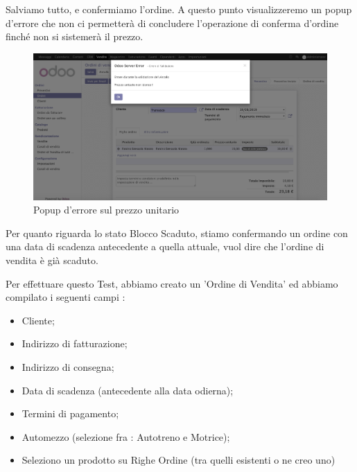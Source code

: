 \newpage
Salviamo tutto, e confermiamo l'ordine. A questo punto visualizzeremo un popup d'errore che non ci permetterà di concludere l'operazione di conferma d'ordine finché non si sistemerà il prezzo.
\begin{figure}[H]
	\begin{center} \includegraphics[scale=0.3]{figures/error_price}
		\caption[Popup d'errore sul prezzo unitario]{Popup d'errore sul prezzo unitario}
		\label{fig:error_price}
	\end{center}
\end{figure}
Per quanto riguarda lo stato Blocco Scaduto, stiamo confermando un ordine con una data di scadenza antecedente a quella attuale, vuol dire che l'ordine di vendita è già scaduto.

\vspace*{0.5cm}
Per effettuare questo Test, abbiamo creato un 'Ordine di Vendita' ed abbiamo compilato i seguenti campi :

\begin{itemize}
	\item Cliente;
	\item Indirizzo di fatturazione;
	\item Indirizzo di consegna;
	\item Data di scadenza (antecedente alla data odierna);
	\item Termini di pagamento;
	\item Automezzo (selezione fra : Autotreno e Motrice);
	\item Seleziono un prodotto su Righe Ordine (tra quelli esistenti o ne creo uno)
\end{itemize}

